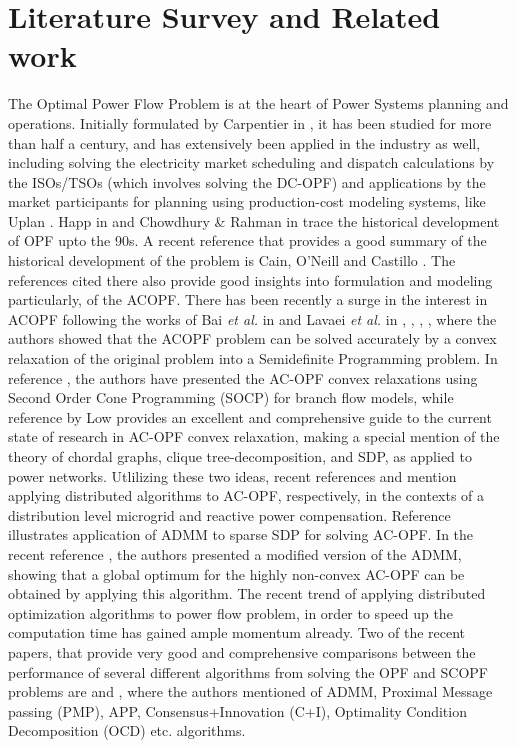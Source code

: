 \documentclass[preprint,12pt,3p]{elsarticle}
\begin{document}
\section{Literature Survey and Related work}
\label{literature}
\noindent The Optimal Power Flow Problem is at the heart of Power Systems planning and operations. Initially formulated by Carpentier in \cite{Carp:62}, it has been studied for more than half a century, and has extensively been applied in the industry as well, including solving the electricity market scheduling and dispatch calculations by the ISOs/TSOs (which involves solving the DC-OPF) and applications by the market participants for planning using production-cost modeling systems, like Uplan \cite{Sambuddha2010}. Happ in \cite{Happ:77} and Chowdhury \& Rahman in \cite{CR:90} trace the historical development of OPF upto the 90s. A recent reference that provides a good summary of the historical development of the problem is Cain, O'Neill and Castillo \cite{cain2012history}. The references cited there also provide good insights into formulation and modeling particularly, of the ACOPF. There has been recently a surge in the interest in ACOPF following the works of Bai \emph{et al.} in \cite{BWW:08} and Lavaei \emph{et al.} in \cite{LL:12}, \cite{SL:12a}, \cite{SL:12b}, \cite{LTZ:12}, where the authors showed that the ACOPF problem can be solved accurately by a convex relaxation of the original problem into a Semidefinite Programming problem. In reference \cite{farivar2013branch}, the authors have presented the AC-OPF convex relaxations using Second Order Cone Programming (SOCP) for branch flow models, while reference \cite{low2014convex} by Low provides an excellent and comprehensive guide to the current state of research in AC-OPF convex relaxation, making a special mention of the theory of chordal graphs, clique tree-decomposition, and SDP, as applied to power networks. Utlilizing these two ideas, recent references \cite{dall2013distributed} and \cite{zheng2015fully} mention applying distributed algorithms to AC-OPF, respectively, in the contexts of a distribution level microgrid and reactive power compensation. Reference \cite{ADMMRamMadJav} illustrates application of ADMM to sparse SDP for solving AC-OPF. In the recent reference \cite{MHANNA201891}, the authors presented a modified version of the ADMM, showing that a global optimum for the highly non-convex AC-OPF can be obtained by applying this algorithm. The recent trend of applying distributed optimization algorithms to power flow problem, in order to speed up the computation time has gained ample momentum already. Two of the recent papers, that provide very good and comprehensive comparisons between the performance of several different algorithms from solving the OPF and SCOPF problems are \cite{SurvMol} and \cite{SurvKarg}, where the authors mentioned of ADMM, Proximal Message passing (PMP), APP, Consensus+Innovation (C+I), Optimality Condition Decomposition (OCD) etc. algorithms.
\end{document}
